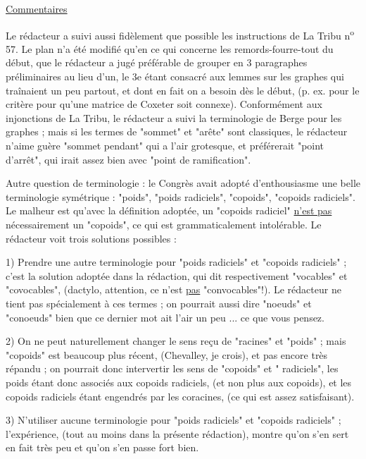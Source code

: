 \begin{center}\uline{Commentaires}\end{center}

Le rédacteur a suivi aussi fidèlement que possible les instructions de La Tribu n\textsuperscript{o} 57. Le plan n'a été modifié qu'en ce qui concerne les remords-fourre-tout du début, que le rédacteur a jugé préférable de grouper en 3 paragraphes préliminaires au lieu d'un, le 3e étant consacré aux lemmes sur les graphes qui traînaient un peu partout, et dont en fait on a besoin dès le début, (p. ex. pour le critère pour qu'une matrice de Coxeter soit connexe). Conformément aux injonctions de La Tribu, le rédacteur a suivi la terminologie de Berge pour les graphes ; mais si les termes de "sommet" et "arête" sont classiques, le rédacteur n'aime guère "sommet pendant" qui a l'air grotesque, et préférerait "point d'arrêt", qui irait assez bien avec "point de ramification".

Autre question de terminologie : le Congrès avait adopté d'enthousiasme une belle terminologie symétrique : "poids", "poids radiciels", "copoids", "copoids radiciels". Le malheur est qu'avec la définition adoptée, un "copoids radiciel" \uline{n'est pas} nécessairement un "copoids", ce qui est grammaticalement intolérable. Le rédacteur voit trois solutions possibles :

1) Prendre une autre terminologie pour "poids radiciels" et "copoids radiciels" ; c'est la solution adoptée dans la rédaction, qui dit respectivement "vocables" et "covocables", (dactylo, attention, ce n'est \uline{pas} "convocables"!). Le rédacteur ne tient pas spécialement à ces termes ; on pourrait aussi dire "noeuds" et "conoeuds" bien que ce dernier mot ait l'air un peu ... ce que vous pensez.

2) On ne peut naturellement changer le sens reçu de "racines" et "poids" ; mais "copoids" est beaucoup plus récent, (Chevalley, je crois), et pas encore très répandu ; on pourrait donc intervertir les sens de "copoids" et " radiciels", les poids étant donc associés aux copoids radiciels, (et non plus aux copoids), et les copoids radiciels étant engendrés par les coracines, (ce qui est assez satisfaisant).

3) N'utiliser aucune terminologie pour "poids radiciels" et "copoids radiciels" ; l'expérience, (tout au moins dans la présente rédaction), montre qu'on s'en sert en fait très peu et qu'on s'en passe fort bien.

